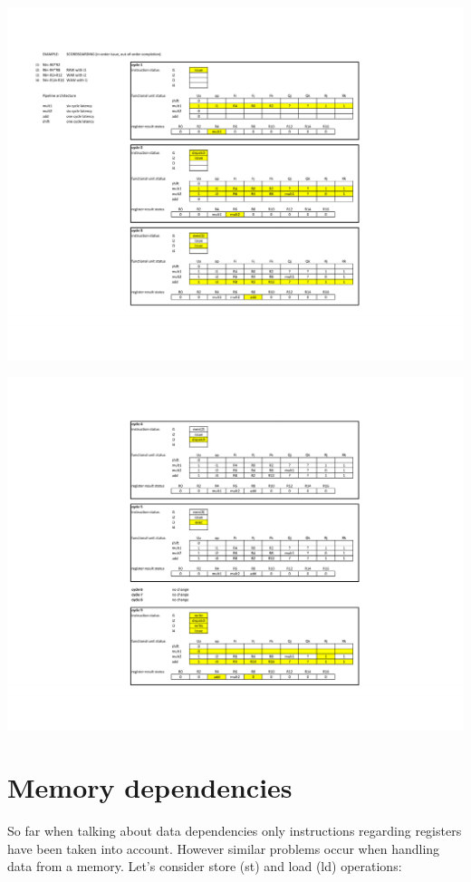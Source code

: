 \begin{center}
  \includegraphics[width=1.0\linewidth]{img/img3/score1}
\end{center}
\begin{center}
  \includegraphics[width=1.0\linewidth]{img/img3/score2}
\end{center}

\section{Memory dependencies}
So far when talking about data dependencies only instructions regarding registers have been taken into account. However similar problems occur when handling data from a memory. Let's consider store (st) and load (ld) operations:


